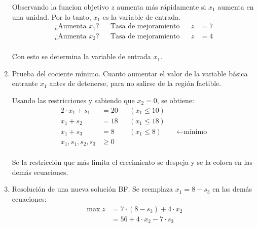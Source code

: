 \documentclass[../main.tex]{subfiles}
\begin{document}
\begin{example}
\begin{enumerate}
                    Observando la funcion objetivo $z$ aumenta más rápidamente si $x_1$ aumenta en una unidad. Por lo tanto, $x_1$ es la variable de entrada.
                    \begin{equation}
                        \begin{aligned}
                            \text{¿Aumenta $x_1$?} && \text{Tasa de mejoramiento} && z &= 7 \\
                            \text{¿Aumenta $x_2$?} && \text{Tasa de mejoramiento} && z &= 4 \\
                        \end{aligned}
                    \end{equation}

                    Con esto se determina la variable de entrada $x_1$.

                \item Prueba del cociente mínimo.
                    Cuanto aumentar el valor de la variable básica entrante $x_1$ antes de detenerse, para no salirse de la región factible.

                    Usando las restricciones y sabiendo que $x_2 = 0$, se obtiene:
                    \begin{equation}
                        \begin{aligned}
                            2 \cdot x_1 + s_1 &= 20 && (x_1 \leq 10)\\
                            x_1 + s_2 &= 18 && (x_1 \leq 18)\\
                            x_1 + s_3 &= 8 && (x_1 \leq 8) && \leftarrow \text{mínimo}\\
                            x_1, s_1, s_2, s_3 &\geq 0 \\
                        \end{aligned}
                    \end{equation}

                    Se la restricción que más limita el crecimiento se despeja y se la coloca en las demás ecuaciones.
                \item Resolución de una nueva solución BF.
                    Se reemplaza $x_1 = 8 - s_3$ en las demás ecuaciones:
                    \begin{equation}
                        \begin{split}
                            \max z &= 7 \cdot (8 - s_3) + 4 \cdot x_2 \\
                                   &= 56 + 4 \cdot x_2 - 7 \cdot s_3 \\
                        \end{split}
                    \end{equation}


\end{enumerate}
\end{example}
\end{document}
